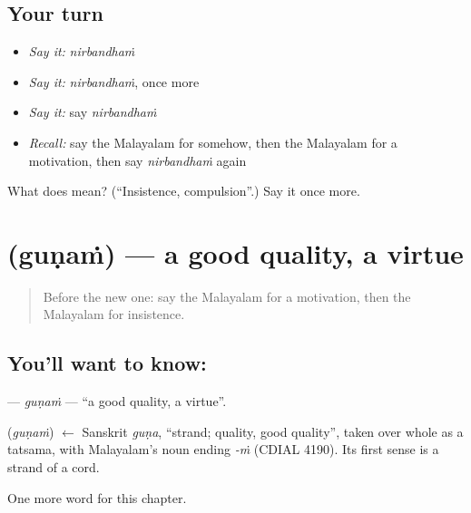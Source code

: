 \subsection*{Your turn}
\begin{itemize}
\raggedright
  \item \emph{Say it:} \emph{nirbandhaṁ}
  \item \emph{Say it:} \emph{nirbandhaṁ}, once more
  \item \emph{Say it:} say \emph{nirbandhaṁ}
  \item \emph{Recall:} say the Malayalam for somehow, then the Malayalam for a motivation, then say \emph{nirbandhaṁ} again
\end{itemize}

\begin{tcolorbox}[breakable,colback=teal!4,colframe=teal!35!black,title={Before you move on}]
What does  mean? (\textquotedblleft{}Insistence, compulsion\textquotedblright{}.) Say it once more.
\end{tcolorbox}
\section[\texorpdfstring{\ml{ഗുണം} (guṇaṁ)}{ഗുണം (guṇaṁ)}]{ (guṇaṁ) — a good quality, a virtue}

\label{lesson:ML-C202-gunam}



\begin{quote}
Before the new one: say the Malayalam for a motivation, then the Malayalam for insistence.
\end{quote}

\subsection*{You'll want to know: }
\textbf{} — \emph{guṇaṁ} — \textquotedblleft{}a good quality, a virtue\textquotedblright{}.

\begin{cousinweb}
\textbf{} (\emph{guṇaṁ}) $\leftarrow$ Sanskrit \emph{guṇa}, \textquotedblleft{}strand; quality, good quality\textquotedblright{}, taken over whole as a tatsama, with Malayalam's noun ending \emph{-ṁ} (CDIAL 4190). Its first sense is a strand of a cord.
\end{cousinweb}

\begin{grammarlens}[title={What you've built}]
One more word for this chapter.
\end{grammarlens}

